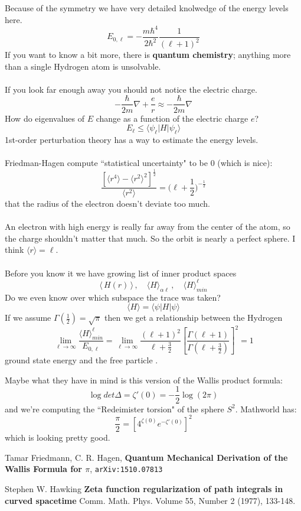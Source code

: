 \documentclass[12pt]{article}
\begin{document}
\noindent Because of the symmetry we have very detailed knolwedge of the energy levels here.
$$ E_{0, \ell } = - \frac{m \hbar^4}{2 \hbar^2} \frac{1}{(\ell + 1)^2} $$
If you want to know a bit more, there is \textbf{quantum chemistry}; anything more than a single Hydrogen atom is unsolvable. \\ \\
If you look far enough away you should not notice the electric charge.
$$  - \frac{\hbar}{2m}\nabla  + \frac{e}{r}  \approx  - \frac{\hbar}{2m}\nabla  $$
How do eigenvalues of $E$ change as a function of the electric charge $e$? 
$$ E_\ell  \leq \langle \psi_\ell | H | \psi_\ell \rangle  $$
1st-order perturbation theory has a way to estimate the energy levels. \\ \\
Friedman-Hagen compute ``statistical uncertainty" to be $0$ (which is nice):
$$ \frac{ [\langle r^4 \rangle - \langle r^2 \rangle^2 ]^{\frac{1}{2}} }{\langle r^2 \rangle} = \Big(\ell + \frac{1}{2}\Big)^{-\frac{1}{2}}$$
that the radius of the electron doesn't deviate too much.  \\ \\
An electron with high energy is really far away from the center of the atom, so the charge shouldn't matter that much.  So the orbit is nearly a perfect sphere.  I think $\langle r \rangle = \ell$. \\\\
Before you know it we have growing list of inner product spaces
$$ \langle \,H(r)\, \rangle\,, \quad \langle H \rangle_{\alpha\ell}\,, \quad \langle H \rangle_{min}^\ell $$
Do we even know over which subspace the trace was taken? 
$$ \langle H \rangle = \langle \psi | H | \psi \rangle $$
If we assume $\Gamma(\frac{1}{2}) = \sqrt{\pi}$ then we get a relationship between the Hydrogen 
$$ \lim_{\ell \to \infty} \frac{\langle H \rangle_{min}^\ell }{ E_{0, \ell}} 
= \lim_{\ell \to \infty}  \frac{(\ell+1)^2}{\ell + \frac{3}{2} }\left[ \frac{ \Gamma (\ell + 1) }{   \Gamma (\ell + \frac{3}{2} ) }\right]^2 = 1$$
ground state energy and the free particle .

\newpage

\noindent Maybe what they have in mind is this version of the Wallis product formula:
$$ \log det \Delta = \zeta'(0) = - \frac{1}{2} \log (2\pi)  $$
and we're computing the ``Redeimister torsion" of the sphere $S^2$. Mathworld has:
$$ \frac{\pi}{2} = \left[ 4^{\zeta(0)} e^{- \zeta'(0)} \right]^2 $$
which is looking pretty good.

\vfill

\begin{thebibliography}{}

\item Tamar Friedmann, C. R. Hagen, \textbf{Quantum Mechanical Derivation of the Wallis Formula for $\pi$}, \texttt{arXiv:1510.07813}

\item Stephen W. Hawking \textbf{Zeta function regularization of path integrals in curved spacetime} Comm. Math. Phys.
Volume 55, Number 2 (1977), 133-148.


\end{thebibliography}
\end{document}
